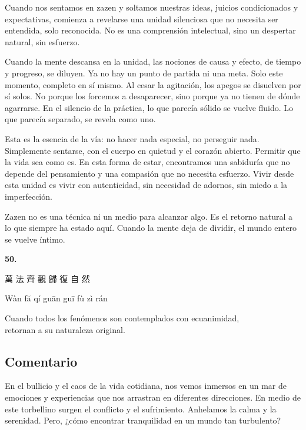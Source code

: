 \documentclass[
  a5paperpaper,
]{article}
\begin{document}
Cuando nos sentamos en zazen y soltamos nuestras ideas, juicios
condicionados y expectativas, comienza a revelarse una unidad silenciosa
que no necesita ser entendida, solo reconocida. No es una comprensión
intelectual, sino un despertar natural, sin esfuerzo.

Cuando la mente descansa en la unidad, las nociones de causa y efecto,
de tiempo y progreso, se diluyen. Ya no hay un punto de partida ni una
meta. Solo este momento, completo en sí mismo. Al cesar la agitación,
los apegos se disuelven por sí solos. No porque los forcemos a
desaparecer, sino porque ya no tienen de dónde agarrarse. En el silencio
de la práctica, lo que parecía sólido se vuelve fluido. Lo que parecía
separado, se revela como uno.

Esta es la esencia de la vía: no hacer nada especial, no perseguir nada.
Simplemente sentarse, con el cuerpo en quietud y el corazón abierto.
Permitir que la vida sea como es. En esta forma de estar, encontramos
una sabiduría que no depende del pensamiento y una compasión que no
necesita esfuerzo. Vivir desde esta unidad es vivir con autenticidad,
sin necesidad de adornos, sin miedo a la imperfección.

Zazen no es una técnica ni un medio para alcanzar algo. Es el retorno
natural a lo que siempre ha estado aquí. Cuando la mente deja de
dividir, el mundo entero se vuelve íntimo.

\hfill\break

\hypertarget{05}{}
\begin{verseblock}

\newpage

\begin{center}\textbf{50.}\end{center}

萬 法 齊 觀 歸 復 自 然

Wàn fă qí guān guī fù zì rán

Cuando todos los fenómenos son contemplados con ecuanimidad,\\
retornan a su naturaleza original.

\end{verseblock}

\hfill\break

\hypertarget{comentario-49}{%
\subsection{Comentario}\label{comentario-49}}

En el bullicio y el caos de la vida cotidiana, nos vemos inmersos en un
mar de emociones y experiencias que nos arrastran en diferentes
direcciones. En medio de este torbellino surgen el conflicto y el
sufrimiento. Anhelamos la calma y la serenidad. Pero, ¿cómo encontrar
tranquilidad en un mundo tan turbulento?
\end{document}
